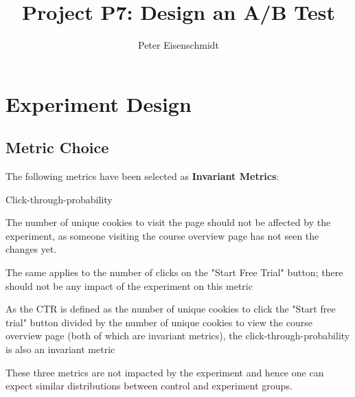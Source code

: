 \documentclass[11pt]{article} %
\title{Project P7: Design an A/B Test}
\author{Peter Eisenschmidt}
\begin{document}
\maketitle

\section{Experiment Design}

\subsection{Metric Choice}

The following metrics have been selected as \textbf{Invariant Metrics}:
\begin{labeling}{Click-through-probability}
\item [Number of cookies] The number of unique cookies to visit the page should not be affected by the experiment, as someone visiting the course overview page has not seen the changes yet. 
\item [Number of clicks] The same applies to the number of clicks on the "Start Free Trial" button; there should not be any impact of the experiment on this metric
\item [Click-through-probability] As the CTR is defined as the number of unique cookies to click the "Start free trial" button divided by the number of unique cookies to view the course overview page (both of which are invariant metrics), the click-through-probability is also an invariant metric
\end{labeling}
\noindent These three metrics are not impacted by the experiment and hence one can expect similar distributions between control and experiment groups.
\medskip
\end{document}
